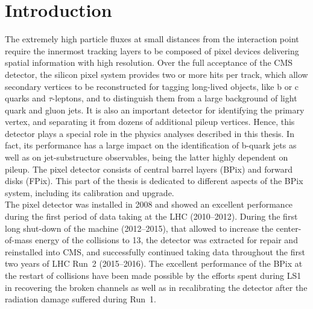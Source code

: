 \chapter{Introduction}\label{ch:BPixIntro}

The extremely high particle fluxes at small distances from the interaction point require the innermost tracking layers to be composed of pixel devices delivering spatial information with high resolution.
Over the full acceptance of the CMS detector, the silicon pixel system provides two or more hits per track, which allow secondary vertices to be reconstructed for tagging long-lived objects, like b or c quarks and $\tau$-leptons, and to distinguish them from a large background of light quark and gluon jets. It is also an important detector for identifying the primary vertex, and separating it from dozens of additional pileup vertices.
Hence, this detector plays a special role in the physics analyses described in this thesis. In fact, its performance has a large impact on the identification of b-quark jets as well as on jet-substructure observables, being the latter highly dependent on pileup.
The pixel detector consists of central barrel layers (BPix) and forward disks (FPix).
This part of the thesis is dedicated to different aspects of the BPix system, including its calibration and upgrade.\\ 

The pixel detector was installed in 2008 and showed an excellent performance during the first period of data taking at the LHC (2010--2012).
During the first long shut-down of the machine (2012--2015), that allowed to increase the center-of-mass energy of the collisions to 13\TeV, the detector was extracted for repair and reinstalled into CMS, and successfully continued taking data throughout the first two years of LHC Run~2 (2015--2016). The excellent performance of the BPix at the restart of collisions have been made possible by the efforts spent during LS1 in recovering the broken channels as well as in recalibrating the detector after the radiation damage suffered during Run~1.

